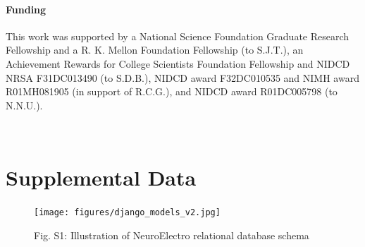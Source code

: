 \documentclass{template/frontiersSCNS} %
\begin{document}
\paragraph{Funding\textcolon} This work was supported by a National Science Foundation Graduate Research Fellowship and a R. K. Mellon Foundation Fellowship (to S.J.T.), an Achievement Rewards for College Scientists Foundation Fellowship and NIDCD NRSA F31DC013490 (to S.D.B.), NIDCD award F32DC010535 and NIMH award R01MH081905 (in support of R.C.G.), and NIDCD award R01DC005798 (to N.N.U.).


\
\section*{Supplemental Data}  
\begin{figure}[htbp]
\centering
\texttt{[image: figures/django\_models\_v2.jpg]}

Fig. S1: Illustration of NeuroElectro relational database schema
\end{figure}
\end{document}
